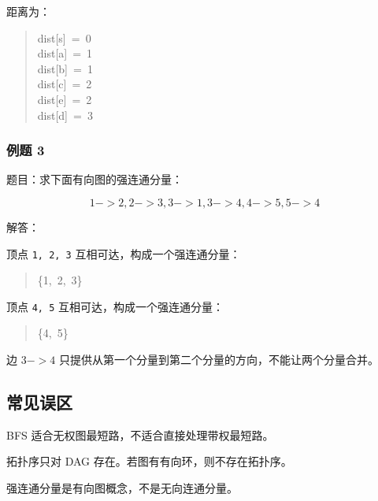 \documentclass[UTF8,zihao=-4]{ctexart}
\begin{document}
距离为：

\begin{quote}
\small\ttfamily\raggedright
\relax dist[s]\ =\ 0\\
\relax dist[a]\ =\ 1\\
\relax dist[b]\ =\ 1\\
\relax dist[c]\ =\ 2\\
\relax dist[e]\ =\ 2\\
\relax dist[d]\ =\ 3\\
\end{quote}

\subsubsection*{例题 3}

题目：求下面有向图的强连通分量：

\[1->2, 2->3, 3->1, 3->4, 4->5, 5->4\]

解答：

顶点 \texttt{1, 2, 3} 互相可达，构成一个强连通分量：

\begin{quote}
\small\ttfamily\raggedright
\relax \{1,\ 2,\ 3\}\\
\end{quote}

顶点 \texttt{4, 5} 互相可达，构成一个强连通分量：

\begin{quote}
\small\ttfamily\raggedright
\relax \{4,\ 5\}\\
\end{quote}

边 $3->4$ 只提供从第一个分量到第二个分量的方向，不能让两个分量合并。

\subsection*{常见误区}

BFS 适合无权图最短路，不适合直接处理带权最短路。

拓扑序只对 DAG 存在。若图有有向环，则不存在拓扑序。

强连通分量是有向图概念，不是无向连通分量。
\end{document}
